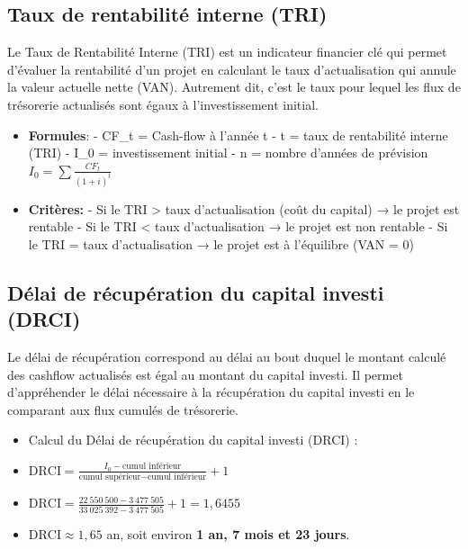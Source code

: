\subsection{Taux de rentabilité interne (TRI)}
Le Taux de Rentabilité Interne (TRI) est un indicateur financier clé qui permet d'évaluer la rentabilité d'un projet en calculant le taux d'actualisation qui annule la valeur actuelle nette (VAN). Autrement dit, c'est le taux pour lequel les flux de trésorerie actualisés sont égaux à l'investissement initial.
\begin{itemize}
    \item \textbf{Formules}:
        - CF\_t = Cash-flow à l'année t
        - t = taux de rentabilité interne (TRI)
        - I\_0 = investissement initial
        - n = nombre d'années de prévision
        $I_0 = \sum \frac{CF_t}{(1 + i)^t}$
    \item \textbf{Critères:}
    - Si le TRI > taux d'actualisation (coût du capital) → le projet est rentable
    - Si le TRI < taux d'actualisation → le projet est non rentable
    - Si le TRI = taux d'actualisation → le projet est à l'équilibre (VAN = 0)
\end{itemize}

\subsection{Délai de récupération du capital investi (DRCI)}

Le délai de récupération correspond au délai au bout duquel le montant calculé des cashflow actualisés est égal au montant du capital investi. Il permet d'appréhender le délai nécessaire à la récupération du capital investi en le comparant aux flux cumulés de trésorerie.

\begin{itemize}
    \item Calcul du Délai de récupération du capital investi (DRCI) :
    \item $\text{DRCI} = \frac{I_0 - \text{cumul inférieur}}{\text{cumul supérieur} - \text{cumul inférieur}} + 1$
    \item $\text{DRCI} = \frac{22\ 550\ 500 - 3\ 477\ 505}{33\ 025\ 392 - 3\ 477\ 505} + 1 = 1{,}6455$

    \item $\text{DRCI} \approx 1{,}65$ an, soit environ \textbf{1 an, 7 mois et 23 jours}.
\end{itemize}

